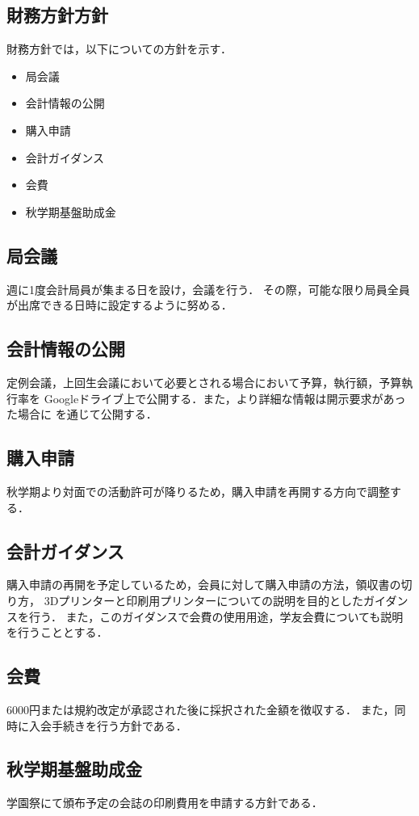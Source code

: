 \subsection*{財務方針方針}


財務方針では，以下についての方針を示す．
\begin{itemize}
  \item 局会議
  \item 会計情報の公開
  \item 購入申請
  \item 会計ガイダンス
  \item 会費
  \item 秋学期基盤助成金
\end{itemize}

\subsection*{局会議}
週に1度会計局員が集まる日を設け，会議を行う．
その際，可能な限り局員全員が出席できる日時に設定するように努める．

\subsection*{会計情報の公開}
定例会議，上回生会議において必要とされる場合において予算，執行額，予算執行率を
Googleドライブ上で公開する．また，より詳細な情報は開示要求があった場合に\kaikeiStaff{}
を通じて公開する．

\subsection*{購入申請}
秋学期より対面での活動許可が降りるため，購入申請を再開する方向で調整する．

\subsection*{会計ガイダンス}
購入申請の再開を予定しているため，会員に対して購入申請の方法，領収書の切り方，
3Dプリンターと印刷用プリンターについての説明を目的としたガイダンスを行う．
また，このガイダンスで会費の使用用途，学友会費についても説明を行うこととする．

\subsection*{会費}
6000円または規約改定が承認された後に採択された金額を徴収する．
また，同時に入会手続きを行う方針である．

\subsection*{秋学期基盤助成金}
学園祭にて頒布予定の会誌の印刷費用を申請する方針である．
